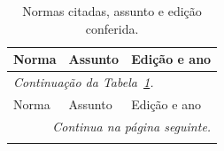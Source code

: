 \begin{longtable}{p{3.6cm} p{5.0cm} p{6.4cm}}
  \caption{Normas citadas, assunto e edição conferida.}
  \label{tab:normas} \\
  \toprule
  Norma & Assunto & Edição e ano \\
  \midrule
  \endfirsthead

  \multicolumn{3}{l}{\small\itshape Continuação da Tabela~\ref{tab:normas}.} \\
  \toprule
  Norma & Assunto & Edição e ano \\
  \midrule
  \endhead

  \midrule
  \multicolumn{3}{r}{\small\itshape Continua na página seguinte.} \\
  \endfoot

  \bottomrule
  \endlastfoot


\end{longtable}
